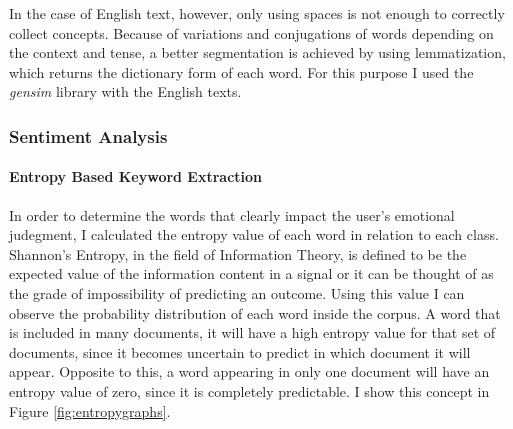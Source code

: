 \documentclass[review]{elsarticle}
\newcommand{\myparagraph}[1]{\paragraph{#1}\mbox{}\smallskip}
\begin{document}
In the case of English text, however, only using spaces is not enough to correctly collect concepts. Because of variations and conjugations of words depending on the context and tense, a better segmentation is achieved by using lemmatization, which returns the dictionary form of each word. For this purpose I used the \textit{gensim} library with the English texts.

\subsubsection{Sentiment Analysis}\label{sentimentanalysis}

\myparagraph{Entropy Based Keyword Extraction}\label{entropy}

In order to determine the words that clearly impact the user’s emotional judegment, I calculated the entropy value of each word in relation to each class. Shannon’s Entropy, in the field of Information Theory, is defined to be the expected value of the information content in a signal \cite{shannon1948} or it can be thought of as the grade of impossibility of predicting an outcome. Using this value I can observe the probability distribution of each word inside the corpus. A word that is included in many documents, it will have a high entropy value for that set of documents, since it becomes uncertain to predict in which document it will appear. Opposite to this, a word appearing in only one document will have an entropy value of zero, since it is completely predictable. I show this concept in Figure \ref{fig:entropygraphs}.
\end{document}
